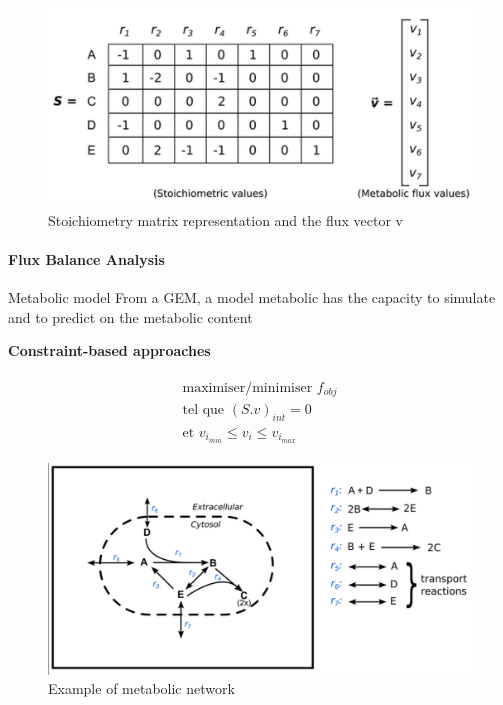 \documentclass[8pt]{beamer}
\begin{document}
\begin{frame}
{\begin{minipage}{0.5\textwidth}
\end{minipage}%
\begin{minipage}{0.5\textwidth}
\begin{figure}
\includegraphics[width=\textwidth]{figures/mass-balance-2}
\caption{Stoichiometry matrix representation and the flux vector v}
\end{figure}

\end{minipage}

}

 {

\framesubtitle{Flux Balance Analysis \tiny \citep{Orth2010}}

\begin{exampleblock}{Metabolic model}
From a GEM, a model metabolic has the capacity to simulate and to predict on the metabolic content
\end{exampleblock}
\textbf{Constraint-based approaches}
\begin{minipage}{0.5\textwidth}

\begin{align*}
\begin{split}
    \text{maximiser/minimiser }\text{$f_{obj}$} \\
    \text{tel que } (S.v)_{int} = 0\\
    \text{et } \text{$v_{i_{min}}$} \leq v_i \leq \text{$v_{i_{max}}$}
\end{split}
\end{align*}

\begin{figure}
\includegraphics[width=\textwidth]{figures/mass-balance-1}
\caption{Example of metabolic network}
\end{figure}


\end{minipage}}
\end{frame}
\end{document}
